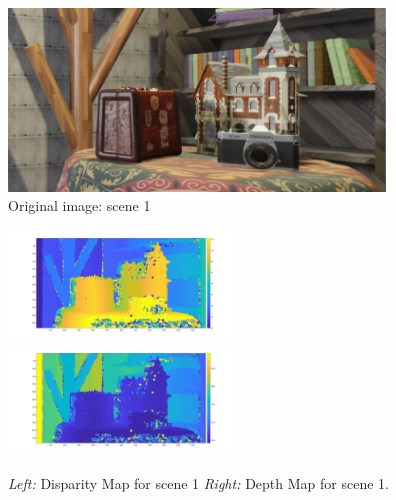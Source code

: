 \begin{figure}[H]
    \centering
    \includegraphics[width=10cm]{scene1_original.jpg}
    \caption{Original image: scene 1}
    \label{fig:scene1_original}
\end{figure}
\begin{figure}[H]
    \centering
    \includegraphics[width=6cm]{scene1_disparity.jpg}
    \includegraphics[width=6cm]{scene1_depth.jpg}
    \caption{\emph{Left:} Disparity Map for scene 1 \emph{Right:} Depth Map for scene 1.}
    \label{fig:scene1_depth_disparity}
\end{figure}

